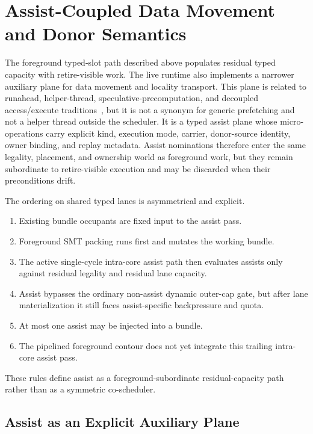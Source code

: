 \documentclass[twocolumn]{article}
\begin{document}
\section{Assist-Coupled Data Movement and Donor Semantics}

The foreground typed-slot path described above populates residual typed capacity with retire-visible work. The live runtime also implements a narrower auxiliary plane for data movement and locality transport. This plane is related to runahead, helper-thread, speculative-precomputation, and decoupled access/execute traditions~\cite{mutlu2003runahead,collins2001speculative,chappell1999ssmt,smith1984decoupled}, but it is not a synonym for generic prefetching and not a helper thread outside the scheduler. It is a typed assist plane whose micro-operations carry explicit kind, execution mode, carrier, donor-source identity, owner binding, and replay metadata. Assist nominations therefore enter the same legality, placement, and ownership world as foreground work, but they remain subordinate to retire-visible execution and may be discarded when their preconditions drift.

The ordering on shared typed lanes is asymmetrical and explicit.

\begin{enumerate}
\item Existing bundle occupants are fixed input to the assist pass.
\item Foreground SMT packing runs first and mutates the working bundle.
\item The active single-cycle intra-core assist path then evaluates assists only against residual legality and residual lane capacity.
\item Assist bypasses the ordinary non-assist dynamic outer-cap gate, but after lane materialization it still faces assist-specific backpressure and quota.
\item At most one assist may be injected into a bundle.
\item The pipelined foreground contour does not yet integrate this trailing intra-core assist pass.
\end{enumerate}

These rules define assist as a foreground-subordinate residual-capacity path rather than as a symmetric co-scheduler.


\subsection{Assist as an Explicit Auxiliary Plane}
\end{document}
